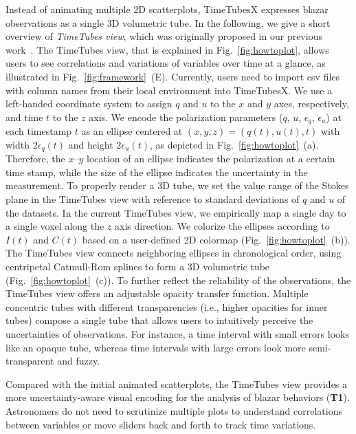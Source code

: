 Instead of animating multiple 2D scatterplots,
TimeTubesX expresses blazar observations as a single 3D volumetric tube. 
In the following, we give a short overview of \emph{TimeTubes view}, which was originally proposed in our previous work~\cite{Fujishiro2018}.
The TimeTubes view, that is explained in Fig.~\ref{fig:howtoplot}, allows users to see correlations and variations of variables over time at a glance, as illustrated in Fig.~\ref{fig:framework}~(E).
Currently, users need to import csv files with column names from their local environment into TimeTubesX.
%
We use a left-handed coordinate system to assign $q$ and $u$ to the $x$ and $y$ axes, respectively, and time $t$ to the $z$ axis.
We encode the polarization parameters ($q$, $u$, $\epsilon_q$, $\epsilon_u$) at each timestamp $t$ as an ellipse centered at $(x, y, z) = (q(t), u(t), t)$ with width $2\epsilon_q(t)$ and height $2\epsilon_u(t)$, as depicted in Fig.~\ref{fig:howtoplot}~(a). 
Therefore, the $x$--$y$ location of an ellipse indicates the polarization at a certain time stamp, while the size of the ellipse indicates the uncertainty in the measurement.
To properly render a 3D tube, we set the value range of the Stokes plane in the TimeTubes view with reference to standard deviations of $q$ and $u$ of the datasets. 
In the current TimeTubes view, we empirically map a single day to a single voxel along the $z$ axis direction.
%
We colorize the ellipses according to $I(t)$ and $C(t)$ based on a user-defined 2D colormap (Fig.~\ref{fig:howtoplot}~(b)). 
The TimeTubes view connects neighboring ellipses in chronological order, using centripetal Catmull-Rom splines to form a 3D volumetric tube (Fig.~\ref{fig:howtoplot}~(c)). 
To further reflect the reliability of the observations, the TimeTubes view offers an adjustable opacity transfer function.
Multiple concentric tubes with different transparencies (i.e., higher opacities for inner tubes) compose a single tube that allows users to intuitively perceive the uncertainties of observations.
For instance, a time interval with small errors looks like an opaque tube, whereas time intervals with large errors look more semi-transparent and fuzzy.

Compared with the initial animated scatterplots,
the TimeTubes view provides a more uncertainty-aware visual encoding for the analysis of blazar behaviors (\textbf{T1}).
Astronomers do not need to scrutinize multiple plots to understand correlations between variables
or move sliders back and forth %
to track time variations.

